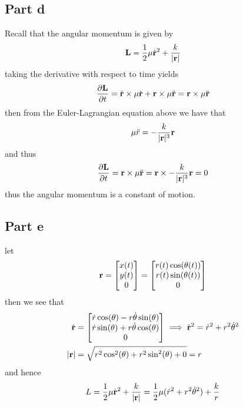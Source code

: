 \documentclass[12pt]{report}
\newcommand{\rb}{\bold{r}}
\begin{document}
\subsection*{Part d}
Recall that the angular momentum is given by
\begin{equation*}
    \bold{L} = \frac{1}{2}\mu \dot{\rb}^2 + \frac{k}{|\rb|}
\end{equation*}
taking the derivative with respect to time yields
\begin{equation*}
    \frac{\partial \bold{L}}{\partial t} = \dot{\rb} \times \mu \dot{\rb} + \rb \times \mu \ddot{\rb} = \rb \times \mu \ddot{\rb}
\end{equation*}
then from the Euler-Lagrangian equation above we have that
\begin{equation*}
    \mu \ddot{r} = -\frac{k}{|\rb|^3}\rb
\end{equation*}
and thus 
\begin{equation*}
     \frac{\partial \bold{L}}{\partial t} = \rb \times \mu \ddot{\rb} = \rb \times -\frac{k}{|\rb|^3}\rb = 0
\end{equation*}
thus the angular momentum is a constant of motion.

\subsection*{Part e}
let 
\begin{equation*}
    \rb = \begin{bmatrix}
        x(t)  \\ y(t) \\ 0
    \end{bmatrix} = \begin{bmatrix}
        r(t)\cos(\theta(t)) \\ r(t)\sin(\theta(t)) \\ 0
    \end{bmatrix}
\end{equation*}
then we see that
\begin{align*}
    \dot{\rb} &= \begin{bmatrix}
        \dot{r}\cos(\theta) - r\dot{\theta} \sin(\theta) \\
        \dot{r}\sin(\theta) + r\dot{\theta} \cos(\theta) \\
        0
    \end{bmatrix} \implies \dot{\rb}^2 = \dot{r}^2  +r^2\dot{\theta}^2 \\
    |\rb| &= \sqrt{r^2\cos^2(\theta) + r^2\sin^2(\theta) + 0 } = r
\end{align*}
and hence
\begin{equation*}
    L = \frac{1}{2}\mu \dot{\rb}^2 + \frac{k}{|\rb|} = \frac{1}{2}\mu (\dot{r}^2 + r^2\dot{\theta}^2) + \frac{k}{r}
\end{equation*}
\end{document}
